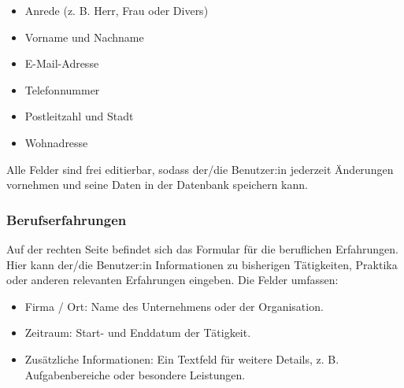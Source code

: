 \begin{itemize}
    \item Anrede (z. B. Herr, Frau oder Divers)
\end{itemize}

\begin{itemize}
    \item Vorname und Nachname
\end{itemize}

\begin{itemize}
    \item E-Mail-Adresse
\end{itemize}

\begin{itemize}
    \item Telefonnummer
\end{itemize}

\begin{itemize}
    \item Postleitzahl und Stadt
\end{itemize}

\begin{itemize}
    \item Wohnadresse
\end{itemize}


Alle Felder sind frei editierbar, sodass der/die Benutzer:in jederzeit Änderungen vornehmen und seine Daten in der Datenbank speichern kann.


\subsubsection{Berufserfahrungen}

Auf der rechten Seite befindet sich das Formular für die beruflichen Erfahrungen. Hier kann der/die Benutzer:in Informationen zu bisherigen Tätigkeiten, Praktika oder anderen relevanten Erfahrungen eingeben. Die Felder umfassen:

\begin{itemize}
    \item Firma / Ort: Name des Unternehmens oder der Organisation.
\end{itemize}
\begin{itemize}
    \item Zeitraum: Start- und Enddatum der Tätigkeit.
\end{itemize}
\begin{itemize}
    \item Zusätzliche Informationen: Ein Textfeld für weitere Details, z. B. Aufgabenbereiche oder besondere Leistungen.
\end{itemize}

